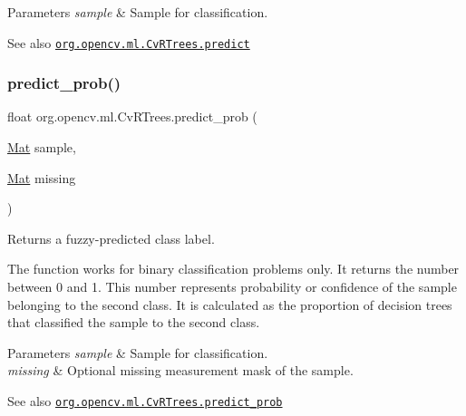 \begin{DoxyParams}{Parameters}
{\em sample} & Sample for classification.\\
\hline
\end{DoxyParams}
\begin{DoxySeeAlso}{See also}
\href{http://docs.opencv.org/modules/ml/doc/random_trees.html#cvrtrees-predict}{\tt org.\+opencv.\+ml.\+Cv\+R\+Trees.\+predict} 
\end{DoxySeeAlso}
\mbox{\label{classorg_1_1opencv_1_1ml_1_1_cv_r_trees_a5ba49f88f868945486251c6bbf04755c}} 
\subsubsection{\texorpdfstring{predict\+\_\+prob()}{predict\_prob()}\hspace{0.1cm}{\footnotesize\ttfamily [1/2]}}
{\footnotesize\ttfamily float org.\+opencv.\+ml.\+Cv\+R\+Trees.\+predict\+\_\+prob (\begin{DoxyParamCaption}\item[{\mbox{\hyperlink{classorg_1_1opencv_1_1core_1_1_mat}{Mat}}}]{sample,  }\item[{\mbox{\hyperlink{classorg_1_1opencv_1_1core_1_1_mat}{Mat}}}]{missing }\end{DoxyParamCaption})}

Returns a fuzzy-\/predicted class label.

The function works for binary classification problems only. It returns the number between 0 and 1. This number represents probability or confidence of the sample belonging to the second class. It is calculated as the proportion of decision trees that classified the sample to the second class.


\begin{DoxyParams}{Parameters}
{\em sample} & Sample for classification. \\
\hline
{\em missing} & Optional missing measurement mask of the sample.\\
\hline
\end{DoxyParams}
\begin{DoxySeeAlso}{See also}
\href{http://docs.opencv.org/modules/ml/doc/random_trees.html#cvrtrees-predict-prob}{\tt org.\+opencv.\+ml.\+Cv\+R\+Trees.\+predict\+\_\+prob} 
\end{DoxySeeAlso}
\mbox{\label{classorg_1_1opencv_1_1ml_1_1_cv_r_trees_a38b12f73af868829d57f23f4c365ad83}} 
